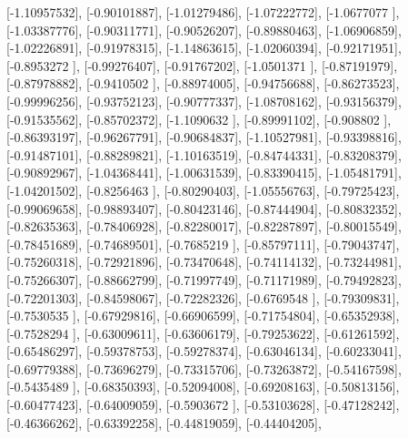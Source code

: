 \documentclass{article}
\begin{document}
       [-1.10957532],
       [-0.90101887],
       [-1.01279486],
       [-1.07222772],
       [-1.0677077 ],
       [-1.03387776],
       [-0.90311771],
       [-0.90526207],
       [-0.89880463],
       [-1.06906859],
       [-1.02226891],
       [-0.91978315],
       [-1.14863615],
       [-1.02060394],
       [-0.92171951],
       [-0.8953272 ],
       [-0.99276407],
       [-0.91767202],
       [-1.0501371 ],
       [-0.87191979],
       [-0.87978882],
       [-0.9410502 ],
       [-0.88974005],
       [-0.94756688],
       [-0.86273523],
       [-0.99996256],
       [-0.93752123],
       [-0.90777337],
       [-1.08708162],
       [-0.93156379],
       [-0.91535562],
       [-0.85702372],
       [-1.1090632 ],
       [-0.89991102],
       [-0.908802  ],
       [-0.86393197],
       [-0.96267791],
       [-0.90684837],
       [-1.10527981],
       [-0.93398816],
       [-0.91487101],
       [-0.88289821],
       [-1.10163519],
       [-0.84744331],
       [-0.83208379],
       [-0.90892967],
       [-1.04368441],
       [-1.00631539],
       [-0.83390415],
       [-1.05481791],
       [-1.04201502],
       [-0.8256463 ],
       [-0.80290403],
       [-1.05556763],
       [-0.79725423],
       [-0.99069658],
       [-0.98893407],
       [-0.80423146],
       [-0.87444904],
       [-0.80832352],
       [-0.82635363],
       [-0.78406928],
       [-0.82280017],
       [-0.82287897],
       [-0.80015549],
       [-0.78451689],
       [-0.74689501],
       [-0.7685219 ],
       [-0.85797111],
       [-0.79043747],
       [-0.75260318],
       [-0.72921896],
       [-0.73470648],
       [-0.74114132],
       [-0.73244981],
       [-0.75266307],
       [-0.88662799],
       [-0.71997749],
       [-0.71171989],
       [-0.79492823],
       [-0.72201303],
       [-0.84598067],
       [-0.72282326],
       [-0.6769548 ],
       [-0.79309831],
       [-0.7530535 ],
       [-0.67929816],
       [-0.66906599],
       [-0.71754804],
       [-0.65352938],
       [-0.7528294 ],
       [-0.63009611],
       [-0.63606179],
       [-0.79253622],
       [-0.61261592],
       [-0.65486297],
       [-0.59378753],
       [-0.59278374],
       [-0.63046134],
       [-0.60233041],
       [-0.69779388],
       [-0.73696279],
       [-0.73315706],
       [-0.73263872],
       [-0.54167598],
       [-0.5435489 ],
       [-0.68350393],
       [-0.52094008],
       [-0.69208163],
       [-0.50813156],
       [-0.60477423],
       [-0.64009059],
       [-0.5903672 ],
       [-0.53103628],
       [-0.47128242],
       [-0.46366262],
       [-0.63392258],
       [-0.44819059],
       [-0.44404205],
\end{document}
